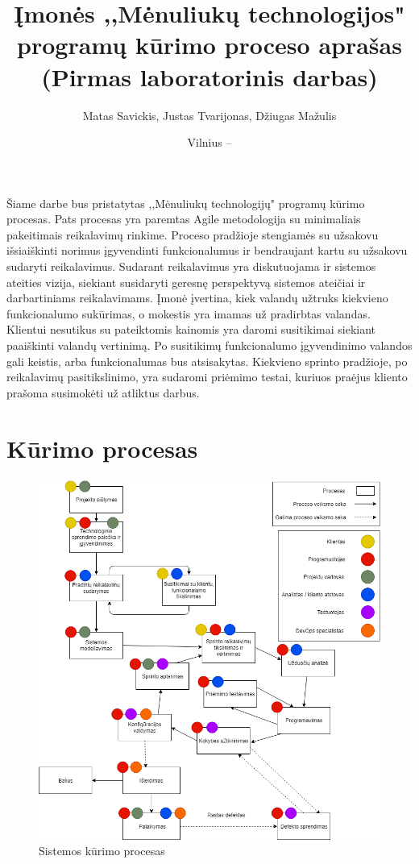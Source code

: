 \documentclass{VUMIFPSkursinis}
\title{Įmonės ,,Mėnuliukų technologijos" programų kūrimo proceso aprašas (Pirmas laboratorinis darbas)}
\author{Matas Savickis, Justas Tvarijonas, Džiugas Mažulis}
\date{Vilnius – \the\year}
\begin{document}
\maketitle

\tableofcontents

	Šiame darbe bus pristatytas ,,Mėnuliukų technologijų" programų kūrimo procesas.
	Pats procesas yra paremtas Agile metodologija su minimaliais pakeitimais reikalavimų rinkime.
	Proceso pradžioje stengiamės su užsakovu išsiaiškinti norimus įgyvendinti funkcionalumus ir bendraujant kartu su užsakovu sudaryti reikalavimus. 
	Sudarant reikalavimus yra diskutuojama ir sistemos ateities vizija, siekiant susidaryti geresnę perspektyvą sistemos ateičiai ir darbartiniams reikalavimams.
	Įmonė įvertina, kiek valandų užtruks kiekvieno funkcionalumo sukūrimas, o mokestis yra imamas už pradirbtas valandas.
	Klientui nesutikus su pateiktomis kainomis yra daromi susitikimai siekiant paaiškinti valandų vertinimą. Po susitikimų funkcionalumo įgyvendinimo valandos gali keistis, arba funkcionalumas bus atsisakytas. 
	Kiekvieno sprinto pradžioje, po reikalavimų pasitikslinimo, yra sudaromi priėmimo testai, kuriuos praėjus kliento prašoma susimokėti už atliktus darbus.

\section{Kūrimo procesas}
	\begin{figure}[htbp]
	\includegraphics[scale=0.6]{img/SoftwareProcessMoonTechnologies}
	\caption{Sistemos kūrimo procesas} %
	\label{img:kurimoProcesas}
	\end{figure}
	\newpage
\end{document}
